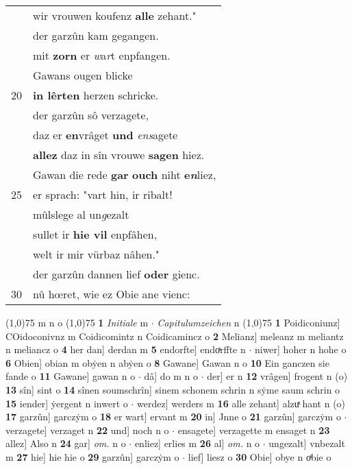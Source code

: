 \documentclass[8pt,a4paper,notitlepage]{article}
\begin{document}
\begin{table}[ht]
\begin{minipage}[t]{0.5\linewidth}
\begin{tabular}{rl}
 & wir vrouwen koufenz \textbf{alle} zehant."\\ 
 & der garzûn kam gegangen.\\ 
 & mit \textbf{zorn} er \textit{w}a\textit{r}t enpfangen.\\ 
 & Gawans ougen blicke\\ 
20 & \textbf{in lêrten} herzen schricke.\\ 
 & der garzûn sô verzagete,\\ 
 & daz er \textbf{en}vrâget \textbf{und} \textit{ens}agete\\ 
 & \textbf{allez} daz in sîn vrouwe \textbf{sagen} hiez.\\ 
 & Gawan die rede \textbf{gar} \textbf{ouch} niht \textbf{e\textit{n}}liez,\\ 
25 & er sprach: "vart hin, ir ribalt!\\ 
 & mûlslege al un\textit{g}ezalt\\ 
 & sullet ir \textbf{hie vil} enpfâhen,\\ 
 & welt ir mir vürbaz nâhen."\\ 
 & der garzûn dannen lief \textbf{oder} gienc.\\ 
30 & nû hœret, wie ez Obie ane vienc:\\ 
\end{tabular}
\scriptsize
\line(1,0){75} \newline
m n o \newline
\line(1,0){75} \newline
\textbf{1} \textit{Initiale} m   $\cdot$ \textit{Capitulumzeichen} n  \newline
\line(1,0){75} \newline
\textbf{1} Poidiconiunz] COidoconivnz m Coidicomintz n Coidicamincz o \textbf{2} Melianz] meleanz m meliantz n meliancz o \textbf{4} her dan] derdan m \textbf{5} endorfte] endoͯrffte n  $\cdot$ niwer] hoher n hohe o \textbf{6} Obien] obian m obẏen n abẏen o \textbf{8} Gawane] Gawan n o \textbf{10} Ein ganczen sie fande o \textbf{11} Gawane] gawan n o  $\cdot$ dâ] do m n o  $\cdot$ der] er n \textbf{12} vrâgen] frogent n (o) \textbf{13} sîn] sint o \textbf{14} sînen soumschrîn] sinem schonem schrin n sẏme saum schrin o \textbf{15} iender] ẏergent n inwert o  $\cdot$ werdez] werders m \textbf{16} alle zehant] alzuͯ hant n (o) \textbf{17} garzûn] garczẏm o \textbf{18} er wart] ervant m \textbf{20} in] Jnne o \textbf{21} garzûn] garczẏm o  $\cdot$ verzagete] verzaget n \textbf{22} und] noch n o  $\cdot$ ensagete] verzagette m ensaget n \textbf{23} allez] Also n \textbf{24} gar] \textit{om.} n o  $\cdot$ enliez] erlies m \textbf{26} al] \textit{om.} n o  $\cdot$ ungezalt] vnbezalt m \textbf{27} hie] hie hie o \textbf{29} garzûn] garczẏm o  $\cdot$ lief] liesz o \textbf{30} Obie] obye n oͯbie o \newline
\end{minipage}
\end{table}
\end{document}
